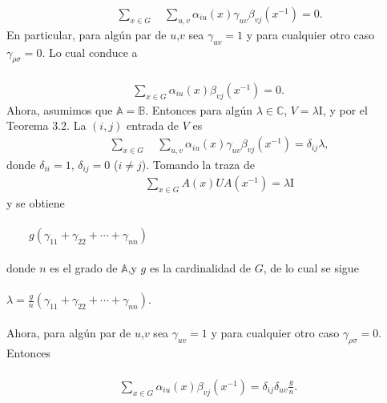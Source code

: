 \documentclass[12pt]{book}
\theoremstyle{definition}
\newcounter{in}
\begin{document}
\begin{equation*}
\begin{aligned}
\qquad \sum_{x \in G} \quad \sum_{u,v} \alpha_{iu}(x) \gamma_{uv} \beta_{vj}(x^{-1}) = 0.
\end{aligned}
\end{equation*}
En particular, para algún par de $u$,$v$ sea $\gamma_{uv}=1$ y para cualquier otro caso $\gamma_{\rho \sigma}=0$. Lo cual conduce a\\~\\
\begin{equation*}
\begin{aligned}
\sum_{x \in G} \alpha_{iu}(x) \beta_{vj}(x^{-1}) = 0.
\end{aligned}
\end{equation*}
Ahora, asumimos que $\mathbb{A}=\mathbb{B}$. Entonces para algún $\lambda \in \mathbb{C}$, $V=\lambda\mathrm{I}$, y por el Teorema 3.2. La $(i,j)$ entrada de $V$ es
\begin{equation*}
\begin{aligned}
\qquad \sum_{x \in G} \quad \sum_{u,v} \alpha_{iu}(x) \gamma_{uv} \beta_{vj}(x^{-1}) = \delta_{ij}\lambda,
\end{aligned}
\end{equation*}
donde $\delta_{ii}=1$, $\delta_{ij}=0$ ($i \neq j$). Tomando la traza de
\begin{equation*}
\begin{aligned}
\qquad \sum_{x \in G} A(x)UA(x^{-1}) = \lambda \mathrm{I}
\end{aligned}
\end{equation*}
y se obtiene\\~\\
$\qquad g(\gamma_{11}+\gamma_{22}+ \cdots +\gamma_{nn})$\\~\\
donde $n$ es el grado de $\mathbb{A}$,y $g$ es la cardinalidad de $G$, de lo cual se sigue\\~\\
$\lambda=\frac{g}{n}(\gamma_{11}+\gamma_{22}+ \cdots + \gamma_{nn})$.\\~\\
Ahora, para algún par de $u$,$v$ sea $\gamma_{uv}=1$ y para cualquier otro caso $\gamma_{\rho \sigma}=0$. Entonces\\~\\
\begin{equation*}
\begin{aligned}
\sum_{x \in G} \alpha_{iu}(x) \beta_{vj}(x^{-1}) = \delta_{ij} \delta_{uv}\frac{g}{n}.
\end{aligned}
\end{equation*}
\end{document}
